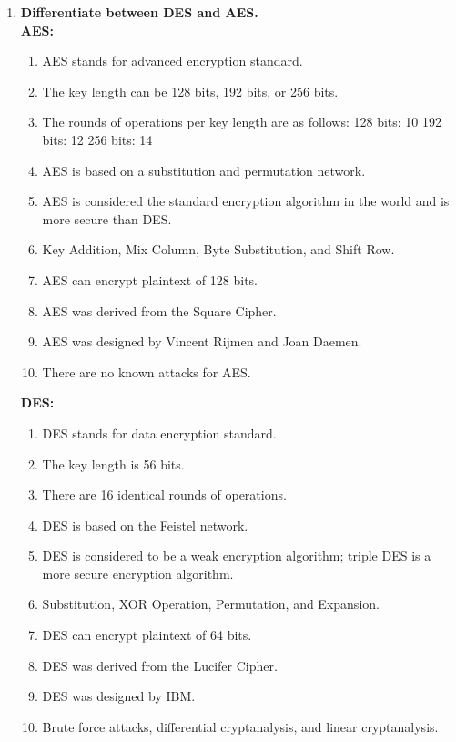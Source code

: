 \documentclass[11pt]{article}
\begin{document}
\begin{enumerate}
	\item \textbf{Differentiate between DES and AES.}\\
	      \textbf{AES: }
	      \begin{enumerate}
		      \item AES stands for advanced encryption standard.
		      \item The key length can be 128 bits, 192 bits, or 256 bits.
		      \item The rounds of operations per key length are as follows: 128 bits: 10 192 bits: 12 256 bits: 14
		      \item AES is based on a substitution and permutation network.
		      \item AES is considered the standard encryption algorithm in the world and is more secure than DES.
		      \item Key Addition, Mix Column, Byte Substitution, and Shift Row.
		      \item AES can encrypt plaintext of 128 bits.
		      \item AES was derived from the Square Cipher.
		      \item AES was designed by Vincent Rijmen and Joan Daemen.
		      \item There are no known attacks for AES.
	      \end{enumerate}

	      \textbf{DES: }
	      \begin{enumerate}
		      \item DES stands for data encryption standard.
		      \item The key length is 56 bits.
		      \item There are 16 identical rounds of operations.
		      \item DES is based on the Feistel network.
		      \item DES is considered to be a weak encryption algorithm; triple DES is a more secure encryption algorithm.
		      \item Substitution, XOR Operation, Permutation, and Expansion.
		      \item DES can encrypt plaintext of 64 bits.
		      \item DES was derived from the Lucifer Cipher.
		      \item DES was designed by IBM.
		      \item Brute force attacks, differential cryptanalysis, and linear cryptanalysis.
	      \end{enumerate}


\end{enumerate}
\end{document}
